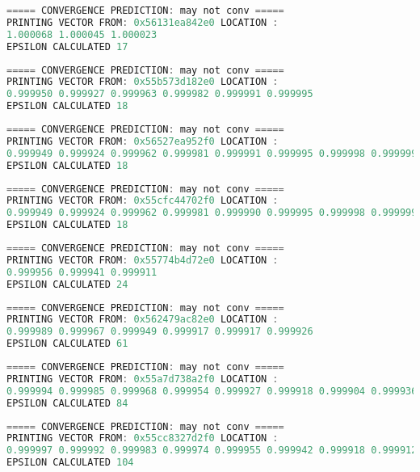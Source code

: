 \begin{lstlisting}[language=C,inputencoding=utf8, basicstyle=\fontsize{8}{10}\selectfont,caption=Execution with A5 dimensions: 3x3]
 ===== CONVERGENCE PREDICTION: may not conv =====
PRINTING VECTOR FROM: 0x56131ea842e0 LOCATION :
1.000068 1.000045 1.000023
EPSILON CALCULATED 17
\end{lstlisting}
\begin{lstlisting}[language=C,inputencoding=utf8, basicstyle=\fontsize{8}{10}\selectfont,caption=Execution with A5 dimensions: 6x6]
 ===== CONVERGENCE PREDICTION: may not conv =====
PRINTING VECTOR FROM: 0x55b573d182e0 LOCATION :
0.999950 0.999927 0.999963 0.999982 0.999991 0.999995
EPSILON CALCULATED 18
\end{lstlisting}
\begin{lstlisting}[language=C,inputencoding=utf8, basicstyle=\fontsize{8}{10}\selectfont,caption=Execution with A5 dimensions: 8x8]
 ===== CONVERGENCE PREDICTION: may not conv =====
PRINTING VECTOR FROM: 0x56527ea952f0 LOCATION :
0.999949 0.999924 0.999962 0.999981 0.999991 0.999995 0.999998 0.999999
EPSILON CALCULATED 18
\end{lstlisting}
\begin{lstlisting}[language=C,inputencoding=utf8, basicstyle=\fontsize{8}{10}\selectfont,caption=Execution with A5 dimensions: 10x10]
 ===== CONVERGENCE PREDICTION: may not conv =====
PRINTING VECTOR FROM: 0x55cfc44702f0 LOCATION :
0.999949 0.999924 0.999962 0.999981 0.999990 0.999995 0.999998 0.999999 0.999999 1.000000
EPSILON CALCULATED 18
\end{lstlisting}
\begin{lstlisting}[language=C,inputencoding=utf8, basicstyle=\fontsize{8}{10}\selectfont,caption=Execution with A6 dimensions: 3x3]
 ===== CONVERGENCE PREDICTION: may not conv =====
PRINTING VECTOR FROM: 0x55774b4d72e0 LOCATION :
0.999956 0.999941 0.999911
EPSILON CALCULATED 24                                                                                              
\end{lstlisting}
\begin{lstlisting}[language=C,inputencoding=utf8, basicstyle=\fontsize{8}{10}\selectfont,caption=Execution with A6 dimensions: 6x6]
 ===== CONVERGENCE PREDICTION: may not conv =====
PRINTING VECTOR FROM: 0x562479ac82e0 LOCATION :
0.999989 0.999967 0.999949 0.999917 0.999917 0.999926
EPSILON CALCULATED 61
\end{lstlisting}
\begin{lstlisting}[language=C,inputencoding=utf8, basicstyle=\fontsize{8}{10}\selectfont,caption=Execution with A6 dimensions: 8x8]
 ===== CONVERGENCE PREDICTION: may not conv =====
PRINTING VECTOR FROM: 0x55a7d738a2f0 LOCATION :
0.999994 0.999985 0.999968 0.999954 0.999927 0.999918 0.999904 0.999936
EPSILON CALCULATED 84
\end{lstlisting}
\begin{lstlisting}[language=C,inputencoding=utf8, basicstyle=\fontsize{8}{10}\selectfont,caption=Execution with A6 dimensions: 10x10]
 ===== CONVERGENCE PREDICTION: may not conv =====
PRINTING VECTOR FROM: 0x55cc8327d2f0 LOCATION :
0.999997 0.999992 0.999983 0.999974 0.999955 0.999942 0.999918 0.999912 0.999902 0.999934
EPSILON CALCULATED 104
\end{lstlisting}
